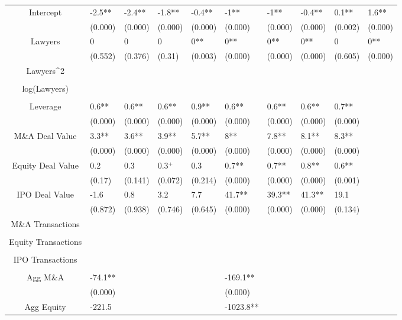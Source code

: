 \documentclass{article}
\begin{document}
\begin{table}[H]
\begin{tabular}{|clllllllll|}
Intercept & -2.5** & -2.4** & -1.8** & -0.4** & -1** & -1** & -0.4** & 0.1** & 1.6** \\ 
   & (0.000) & (0.000) & (0.000) & (0.000) & (0.000) & (0.000) & (0.000) & (0.002) & (0.000) \\ 
  Lawyers & 0 & 0 & 0 & 0** & 0** & 0** & 0** & 0 & 0** \\ 
   & (0.552) & (0.376) & (0.31) & (0.003) & (0.000) & (0.000) & (0.000) & (0.605) & (0.000) \\ 
  Lawyers^2 &  &  &  &  &  &  &  &  &  \\ 
   &  &  &  &  &  &  &  &  &  \\ 
  log(Lawyers) &  &  &  &  &  &  &  &  &  \\ 
   &  &  &  &  &  &  &  &  &  \\ 
  Leverage & 0.6** & 0.6** & 0.6** & 0.9** & 0.6** & 0.6** & 0.6** & 0.7** &  \\ 
   & (0.000) & (0.000) & (0.000) & (0.000) & (0.000) & (0.000) & (0.000) & (0.000) &  \\ 
  M\&A Deal Value & 3.3** & 3.6** & 3.9** & 5.7** & 8** & 7.8** & 8.1** & 8.3** &  \\ 
   & (0.000) & (0.000) & (0.000) & (0.000) & (0.000) & (0.000) & (0.000) & (0.000) &  \\ 
  Equity Deal Value & 0.2 & 0.3 & 0.3$^{+}$ & 0.3 & 0.7** & 0.7** & 0.8** & 0.6** &  \\ 
   & (0.17) & (0.141) & (0.072) & (0.214) & (0.000) & (0.000) & (0.000) & (0.001) &  \\ 
  IPO Deal Value & -1.6 & 0.8 & 3.2 & 7.7 & 41.7** & 39.3** & 41.3** & 19.1 &  \\ 
   & (0.872) & (0.938) & (0.746) & (0.645) & (0.000) & (0.000) & (0.000) & (0.134) &  \\ 
  M\&A Transactions &  &  &  &  &  &  &  &  &  \\ 
   &  &  &  &  &  &  &  &  &  \\ 
  Equity Transactions &  &  &  &  &  &  &  &  &  \\ 
   &  &  &  &  &  &  &  &  &  \\ 
  IPO Transactions &  &  &  &  &  &  &  &  &  \\ 
   &  &  &  &  &  &  &  &  &  \\ 
  Agg M\&A & -74.1** &  &  &  & -169.1** &  &  &  &  \\ 
   & (0.000) &  &  &  & (0.000) &  &  &  &  \\ 
  Agg Equity & -221.5 &  &  &  & -1023.8** &  &  &  &  \\ 

\end{tabular}
\end{table}
\end{document}
